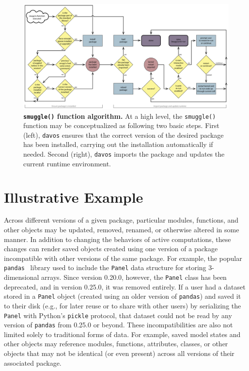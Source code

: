 \documentclass[preprint,12pt,a4paper]{elsarticle}
\begin{document}
\begin{figure}[tp]
\centering
\includegraphics[width=\textwidth]{figs/flow_chart}
\caption{\small \textbf{\texttt{smuggle()} function algorithm.}  At a
  high level, the \texttt{smuggle()} function may be conceptualized as
following two basic steps.  First (left), \texttt{davos} ensures that the
correct version of the desired package has been installed, carrying
out the installation automatically if needed.  Second (right),
\texttt{davos} imports the package and updates the current runtime environment.}
\label{fig:flow-chart}
\end{figure}


\section{Illustrative Example}\label{sec:illustrative-example}

Across different versions of a given package, particular modules, functions, and other objects 
may be updated, removed, renamed, or otherwise altered in some manner.  In addition to changing the
behaviors of active computations, these changes can render saved objects created using one
version of a package incompatible with other versions of the
same package.  For example, the popular \texttt{pandas}~\cite{McKi10}
library used to include the \texttt{Panel} data structure for storing 3-dimensional arrays.  
Since version 0.20.0, however, the \texttt{Panel} class has been deprecated, and in 
version 0.25.0, it was removed entirely. If a user had a dataset stored in a \texttt{Panel} object
(created using an older version of \texttt{pandas}) and saved it to their disk (e.g., for later reuse
or to share with other users) by serializing the \texttt{Panel} with Python's \texttt{pickle} protocol, 
that dataset could not be read by any version of \texttt{pandas} from 0.25.0 or beyond. These
incompatibilities are also not limited solely to traditional forms of data.
For example, saved model states and other objects may reference
modules, functions, attributes, classes, or other objects that may not be identical (or even present)
across all versions of their associated package.
\end{document}
